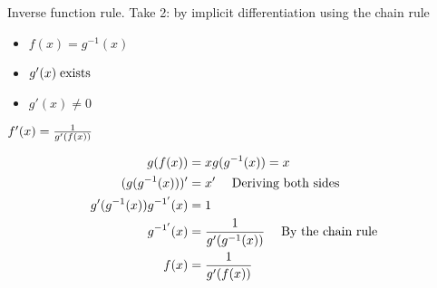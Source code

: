 \begin{property}{Inverse function rule. Take 2: by implicit differentiation using the chain rule}
\begin{precondition}
\begin{itemize}
\item $f(x)=g^{-1}(x)$
\item $g'(x) \; \text{exists} \;$
\item $g'(x) \neq 0$
\end{itemize}
\end{precondition}
\begin{claim}
$f'(x)= \frac{1}{g'(f(x))}$
\end{claim}

\begin{Proof}
\begin{align*}
g(f(x))&=x
g(\ginv(x))=x
\\  (g(\ginv(x)))'&=x' \mathcomment{Deriving both sides}
\\  g'(\ginv(x)) \ginvd(x)&=1
\\  \ginvd(x)&=\inv{g'(\ginv(x))} \mathcomment{By the chain rule}
\\  f(x)&=\inv{g'(f(x))}
\end{align*}
\end{Proof}
\end{property}
